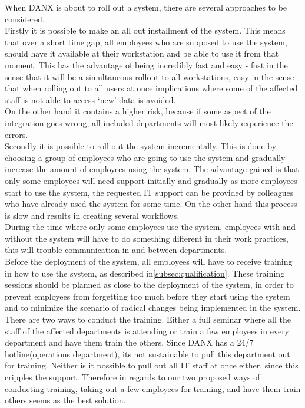 When DANX is about to roll out a system, there are several approaches to be considered.\\
Firstly it is possible to make an all out installment of the system. This means that over a short time gap, all employees who are supposed to use the system, should have it available at their workstation and be able to use it from that moment.
This has the advantage of being incredibly fast and easy - fast in the sense that it will be a simultaneous rollout to all workstations, easy in the sense that when rolling out to all users at once implications where some of the affected staff is not able to access ‘new’ data is avoided.\\
On the other hand it contains a higher risk, because if some aspect of the integration goes wrong, all included departments will most likely experience the errors.\\
Secondly it is possible to roll out the system incrementally. This is done by choosing a group of employees who are going to use the system and gradually increase the amount of employees using the system.
The advantage gained is that only some employees will need support initially and gradually as more employees start to use the system, the requested IT support can be  provided by  colleagues who have already used the system for some time.
On the other hand this process is slow and results in creating several workflows.\\
During the time where only some employees use the system, employees with and without the system will have to do something different in their work practices, this will trouble communication in and between departments.\\
Before the deployment of the system, all employees will have to receive training in how to use the system, as described in\ref{subsec:qualification}. These training sessions should be planned as close to the deployment of the system, in order to prevent employees from forgetting too much before they start using the system and to minimize the scenario of radical changes being implemented in the system.\\
There are two ways to conduct the training. Either a full seminar where all the staff of the affected departments is attending or train a few employees in every department and have them train the others.
Since DANX has a 24/7 hotline(operations department), its not sustainable to pull this department out for training. Neither is it possible to pull out all IT staff at once either, since this cripples the support.
Therefore in regards to our two proposed ways of conducting training, taking out a few employees for training, and have them train others seems as the best solution.

